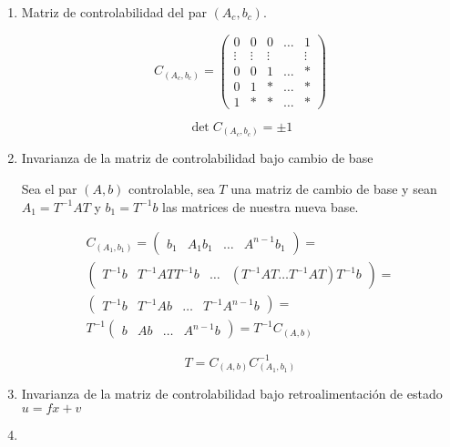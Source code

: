 \documentclass[12pt]{article}
\numberwithin{equation}{subsection}
\begin{document}
\begin{enumerate}
\item Matriz de controlabilidad del par $(A_c, b_c)$.

\begin{equation}
C_{(A_c,b_c)} =
\begin{pmatrix}
0 & 0 & 0 & \dots & 1 \\
\vdots & \vdots & \vdots & & \vdots \\
0 & 0 & 1 & \dots & * \\
0 & 1 & * & \dots & * \\
1 & * & * & \dots & *
\end{pmatrix}
\end{equation}

\begin{equation}
\det{C_{(A_c, b_c)}} = \pm 1
\end{equation}

\item Invarianza de la matriz de controlabilidad bajo cambio de base

Sea el par $(A, b)$ controlable, sea $T$ una matriz de cambio de base y sean $A_1 = T^{-1} A T$ y $b_1 = T^{-1} b$ las matrices de nuestra nueva base.

\begin{multline}
C_{(A_1, b_1)} =
\begin{pmatrix}
b_1 & A_1 b_1 & \dots & A^{n-1} b_1
\end{pmatrix} = \\
\begin{pmatrix}
T^{-1} b & T^{-1} A T T^{-1} b & \dots & (T^{-1} A T \dots T^{-1} A T) T^{-1} b
\end{pmatrix} = \\
\begin{pmatrix}
T^{-1} b & T^{-1} A b & \dots & T^{-1} A^{n-1} b
\end{pmatrix} = \\
T^{-1}
\begin{pmatrix}
b & A b & \dots & A^{n-1} b
\end{pmatrix} =
T^{-1} C_{(A, b)} \nonumber
\end{multline}

\begin{equation}
T = C_{(A, b)} C_{(A_1, b_1)}^{-1}
\end{equation}

\item Invarianza de la matriz de controlabilidad bajo retroalimentación de estado $u = f x + v$



\item
\end{enumerate}
\end{document}
